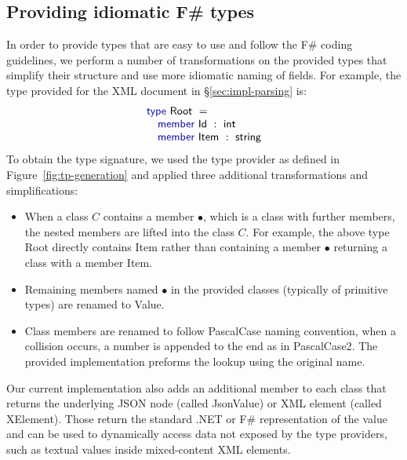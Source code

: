 \documentclass[10pt,nocopyrightspace]{sigplanconf}
\newcommand{\kvd}[1]{\textnormal{\textcolor{kvdclr}{\sffamily #1}}}
\newcommand{\ident}[1]{\textnormal{\sffamily #1}}
\begin{document}
\subsection{Providing idiomatic F\# types}
\label{sec:impl-naming}

In order to provide types that are easy to use and follow the F\# coding guidelines,
we perform a number of transformations on the provided types that simplify their structure
and use more idiomatic naming of fields. For example, the type provided for the XML document in
\S\ref{sec:impl-parsing} is:
\begin{equation*}
\begin{array}{l}
 \kvd{type}~\ident{Root}~=  \\
 \quad \kvd{member}~\ident{Id}~:~\ident{int} \\
 \quad \kvd{member}~\ident{Item}~:~\ident{string}
\end{array}
\end{equation*}
To obtain the type signature, we used the type provider as defined in Figure~\ref{fig:tp-generation}
and applied three additional transformations and simplifications:

\begin{itemize}
\item When a class $C$ contains a member $\bullet$, which is a class with further members, the
  nested members are lifted into the class $C$. For example, the above type \ident{Root}
  directly contains \ident{Item} rather than containing a member $\bullet$ returning a
  class with a member \ident{Item}.

\item Remaining members named $\bullet$ in the provided classes (typically of primitive
  types) are renamed to \ident{Value}.

\item Class members are renamed to follow \ident{PascalCase} naming convention, when a
  collision occurs, a number is appended to the end as in \ident{PascalCase2}. The provided
  implementation preforms the lookup using the original name.
\end{itemize}

Our current implementation also adds an additional member to each class that returns the
underlying JSON node (called \ident{JsonValue}) or XML element (called \ident{XElement}).
Those return the standard .NET or F\# representation of the value and can be used to dynamically
access data not exposed by the type providers, such as textual values inside mixed-content XML elements.
\end{document}

